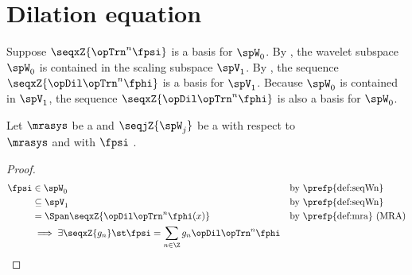 \section{Dilation equation}
Suppose $\seqxZ{\opTrn^n\fpsi}$ is a basis for $\spW_0$.
By , the wavelet subspace $\spW_0$ is contained in the 
scaling subspace $\spV_1$.
By , the sequence $\seqxZ{\opDil\opTrn^n\fphi}$ is a basis for $\spV_1$.
Because $\spW_0$ is contained in $\spV_1$,
the sequence $\seqxZ{\opDil\opTrn^n\fphi}$ is also a basis for $\spW_0$.

\begin{theorem}
\label{thm:g->psi}
Let $\mrasys$ be a  
and $\seqjZ{\spW_j}$ be a   
with respect to\\
$\mrasys$ and with  $\fpsi$ .
\end{theorem}
\begin{proof}
\begin{align*}
  \fpsi &\in \spW_0
        && \text{by \prefp{def:seqWn}}
      \\&\subseteq \spV_1
        && \text{by \prefp{def:seqWn}}
      \\&= \Span\seqxZ{\opDil\opTrn^n\fphi(x)}
        && \text{by \prefp{def:mra} (MRA)}
      \\&\implies 
         \exists \seqxZ{g_n} \st
            \fpsi = \sum_{n\in\Z}  g_n \opDil \opTrn^n \fphi
\end{align*}

\end{proof}

